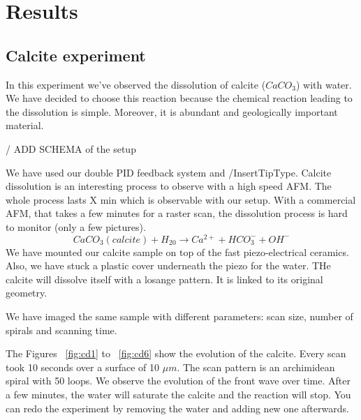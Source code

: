 \chapter{Results}


\section{Calcite experiment}

In this experiment we've observed the dissolution of calcite ($CaCO_3$) with water. We have decided to choose this reaction because the chemical reaction leading to the dissolution is simple. Moreover, it is abundant and geologically important material.\cite{hillner1992atomic}\cite{liang1996dissolution}

/ ADD SCHEMA of the setup

We have used our double PID feedback system and /InsertTipType. Calcite dissolution is an interesting process to observe with a high speed AFM. The whole process lasts X min which is observable with our setup. With a commercial AFM, that takes a few minutes for a raster scan, the dissolution process is hard to monitor (only a few pictures).
\begin{equation}\label{calcite}
CaCO_3(calcite) + H_20 \rightarrow Ca^{2+} + HCO_3^- + OH^- 
\end{equation}
We have mounted our calcite sample on top of the fast piezo-electrical ceramics. Also, we have stuck a plastic cover underneath the piezo for the water. THe calcite will dissolve itself with a losange pattern. It is linked to its original geometry.

We have imaged the same sample with different parameters: scan size, number of spirals and scanning time.

The Figures ~\ref{fig:cd1} to ~\ref{fig:cd6} show the evolution of the calcite. Every scan took 10 seconds over a surface of 10 $\mu m$. The scan pattern is an archimidean spiral with 50 loops. We observe the evolution of the front wave over time. After a few minutes, the water will saturate the calcite and the reaction will stop. You can redo the experiment by removing the water and adding new one afterwards.


